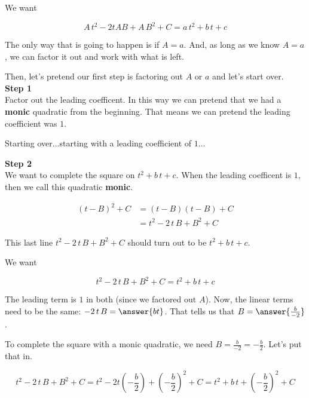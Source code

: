 \documentclass{ximera}
\begin{document}
We want


\[ A \, t^2 - 2 t A B + A \, B^2 + C = a \, t^2 + b \, t + c \]



The only way that is going to happen is if $A = a$. And, as long as we know $A = a$, we can factor it out and work with what is left.

Then, let's pretend our first step is factoring out $A$ or $a$ and let's start over. \\






\textbf{\textcolor{blue!75!black}{Step 1}} \\

 Factor out the leading coefficent.   In this way we can pretend that we had a \textbf{monic} quadratic from the beginning.  That means we can pretend the leading coefficient was $1$.


Starting over...starting with a leading coefficient of $1$...


\textbf{\textcolor{blue!75!black}{Step 2}} \\


We want to complete the square on $t^2 + b \, t + c$.  When the leading coefficent is $1$, then we call this quadratic \textbf{monic}.



\begin{align*}
(t-B)^2 + C & = (t - B)(t - B) + C \\
& = t^2 - 2 \, t \, B + B^2 + C  
\end{align*}


This last line $t^2 - 2 \, t \, B + B^2 + C$ should turn out to be $t^2 + b \, t + c$.

We want


\[   t^2 - 2 \, t \, B + B^2 + C = t^2 + b \, t + c   \]



\begin{explanation}


The leading term is $1$ in both (since we factored out $A$). Now, the linear terms need to be the same: $ - 2 \, t \, B = \answer{b t}$.  That tells us that $B = \answer{\frac{b}{-2}}$.

\end{explanation}


To complete the square with a monic quadratic, we need $B = \frac{b}{-2} = -\frac{b}{2}$.  Let's put that in.


\[ t^2 - 2 \, t \, B + B^2 + C = t^2 - 2 t \left( -\frac{b}{2} \right) + \left( -\frac{b}{2} \right)^2 + C = t^2 + b \, t + \left(-\frac{b}{2}\right)^2 + C \]
\end{document}
